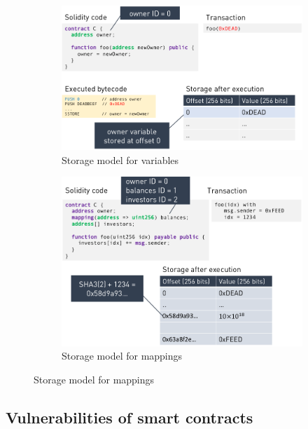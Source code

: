 \documentclass[11pt,oneside,a4paper]{article}
\begin{document}
\vspace{-\topsep}
\begin{figure}[hb]
	\centering
	\begin{subfigure}[t]{.5\textwidth}
		\centering
		\includegraphics[width=1\linewidth]{figures/storage_model_var}
		\caption{Storage model for variables}
		\label{fig:storage_model_var}
	\end{subfigure}%
	\begin{subfigure}[t]{.5\textwidth}
		\centering
		\includegraphics[width=1\linewidth]{figures/storage_model_mapping}
		\caption{Storage model for mappings}
		\label{fig:storage_model_mapping}
	\end{subfigure}
\end{figure}
\vspace{-\topsep}

\newpage

\subsection{Vulnerabilities of smart contracts}
\end{document}
